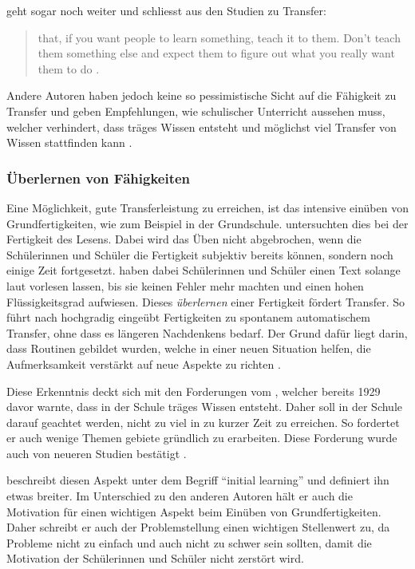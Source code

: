 \citeauthor{Detterman1993} geht sogar noch weiter und schliesst aus den Studien zu Transfer:
\begin{quote}
that, if you want people to learn something, teach it to them. Don't teach them something else and expect them to figure out what you really want them to do \citep[S. 21]{Detterman1993}.
\end{quote}

Andere Autoren haben jedoch keine so pessimistische Sicht auf die Fähigkeit zu Transfer und geben Empfehlungen, wie schulischer Unterricht aussehen muss, welcher verhindert, dass träges Wissen entsteht und möglichst viel Transfer von Wissen stattfinden kann \citep[Kapitel 3]{Bransford2000}.


\subsubsection{Überlernen von Fähigkeiten}
Eine Möglichkeit, gute Transferleistung zu erreichen, ist das intensive einüben von Grundfertigkeiten, wie zum Beispiel in der Grundschule. \citet{LaBerge1974} untersuchten dies bei der Fertigkeit des Lesens. Dabei wird das Üben nicht abgebrochen, wenn die Schülerinnen und Schüler die Fertigkeit subjektiv bereits können, sondern noch einige Zeit fortgesetzt. \citeauthor{LaBerge1974} haben dabei Schülerinnen und Schüler einen Text solange laut vorlesen lassen, bis sie keinen Fehler mehr machten und einen hohen Flüssigkeitsgrad aufwiesen. Dieses \textit{überlernen} einer Fertigkeit fördert Transfer. So führt nach \citet{Perkins1989} hochgradig eingeübt Fertigkeiten zu spontanem automatischem Transfer, ohne dass es längeren Nachdenkens bedarf. Der Grund dafür liegt darin, dass Routinen gebildet wurden, welche in einer neuen Situation helfen, die Aufmerksamkeit verstärkt auf neue Aspekte zu richten \citep{LaBerge1974, Mietzel2007}.

Diese Erkenntnis deckt sich mit den Forderungen vom \citet{Whitehead1929}, welcher bereits 1929 davor warnte, dass in der Schule träges Wissen entsteht. Daher soll in der Schule darauf geachtet werden, nicht zu viel in zu kurzer Zeit zu erreichen. So fordertet er auch wenige Themen gebiete gründlich zu erarbeiten. Diese Forderung wurde auch von neueren Studien bestätigt \citep{Porter1989,Brophy1992a,Millar1999}. 

\citet{Bransford2000} beschreibt diesen Aspekt unter dem Begriff "`initial learning"' und definiert ihn etwas breiter.  Im Unterschied zu den anderen Autoren hält er auch die Motivation für einen wichtigen Aspekt beim Einüben von Grundfertigkeiten. Daher schreibt er auch der Problemstellung einen wichtigen Stellenwert zu, da Probleme nicht zu einfach und auch nicht zu schwer sein sollten, damit die Motivation der Schülerinnen und Schüler nicht zerstört wird.

